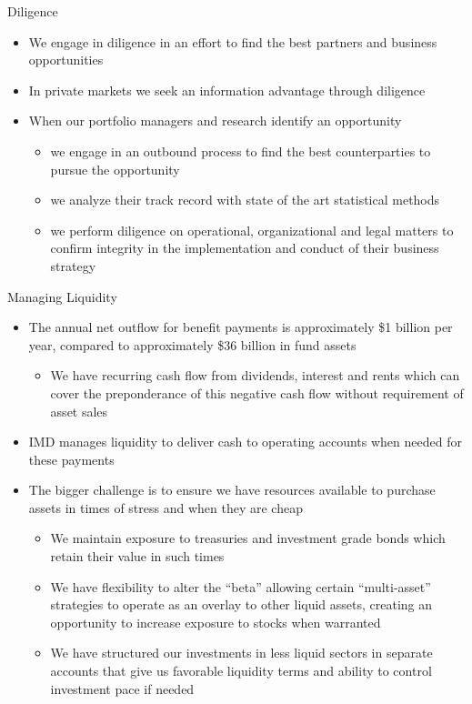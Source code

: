 \documentclass[10pt,english]{beamer}\usepackage[]{graphicx}\usepackage[]{color}
\begin{document}
%
\begin{frame}{Diligence}
\begin{itemize}
\item We engage in diligence in an effort to find the best partners and
business opportunities
\item In private markets we seek an information advantage through diligence
\item When our portfolio managers and research identify an opportunity
\begin{itemize}
\item we engage in an outbound process to find the best counterparties to
pursue the opportunity
\item we analyze their track record with state of the art statistical methods
\item we perform diligence on operational, organizational and legal matters
to confirm integrity in the implementation and conduct of their business
strategy
\end{itemize}
\end{itemize}
\end{frame}
%
\begin{frame}{Managing Liquidity}
\begin{itemize}
\item The annual net outflow for benefit payments is approximately \$1 billion
per year, compared to approximately \$36 billion in fund assets
\begin{itemize}
\item We have recurring cash flow from dividends, interest and rents which
can cover the preponderance of this negative cash flow without requirement
of asset sales
\end{itemize}
\item IMD manages liquidity to deliver cash to operating accounts when needed
for these payments
\item The bigger challenge is to ensure we have resources available to purchase
assets in times of stress and when they are cheap
\begin{itemize}
\item We maintain exposure to treasuries and investment grade bonds which
retain their value in such times 
\item We have flexibility to alter the ``beta'' allowing certain ``multi-asset''
strategies to operate as an overlay to other liquid assets, creating
an opportunity to increase exposure to stocks when warranted
\item We have structured our investments in less liquid sectors in separate
accounts that give us favorable liquidity terms and ability to control
investment pace if needed
\end{itemize}
\end{itemize}
\end{frame}
\end{document}
